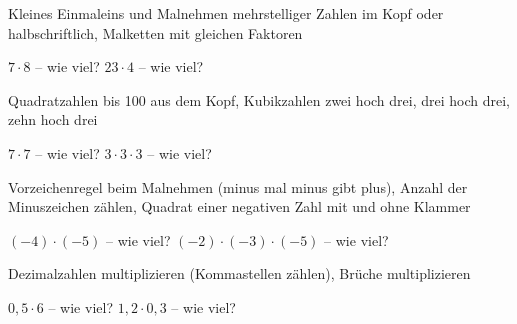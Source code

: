 \setcounter{aufgabe}{0}

\begin{aufgabe}{Kleines Einmaleins und Malnehmen mehrstelliger Zahlen im Kopf oder halbschriftlich, Malketten mit gleichen Faktoren}
\begin{teile}
\teil $7 \cdot 8$ – wie viel? \leerfeld
\teil $23 \cdot 4$ – wie viel? \leerfeld
\end{teile}
\end{aufgabe}

\begin{aufgabe}{Quadratzahlen bis 100 aus dem Kopf, Kubikzahlen zwei hoch drei, drei hoch drei, zehn hoch drei}
\begin{teile}
\teil $7 \cdot 7$ – wie viel? \leerfeld
\teil $3 \cdot 3 \cdot 3$ – wie viel? \leerfeld
\end{teile}
\end{aufgabe}

\begin{aufgabe}{Vorzeichenregel beim Malnehmen (minus mal minus gibt plus), Anzahl der Minuszeichen zählen, Quadrat einer negativen Zahl mit und ohne Klammer}
\begin{teile}
\teil $(-4) \cdot (-5)$ – wie viel? \leerfeld
\teil $(-2) \cdot (-3) \cdot (-5)$ – wie viel? \leerfeld
\end{teile}
\end{aufgabe}

\begin{aufgabe}{Dezimalzahlen multiplizieren (Kommastellen zählen), Brüche multiplizieren}
\begin{teile}
\teil $0{,}5 \cdot 6$ – wie viel? \leerfeld
\teil $1{,}2 \cdot 0{,}3$ – wie viel? \leerfeld
\end{teile}
\end{aufgabe}

